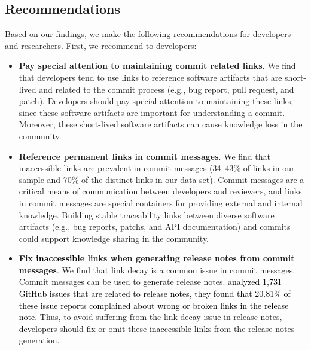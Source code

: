\documentclass[smallextended]{svjour3}       %
\newcommand{\fix}[1]{\textcolor{black}{#1}}
\newcommand{\minor}[1]{\textcolor{black}{#1}}
\begin{document}
\subsection{Recommendations}
Based on our findings, we make the following recommendations for developers and researchers. First,
we recommend to developers:
\begin{itemize}
\item \textbf{\textsf{Pay special attention to maintaining commit related links}}. We find that developers tend to use links to reference software artifacts that are short-lived and related to the commit process (e.g., bug report, pull request, and patch). Developers should pay special attention to maintaining these links, since these software artifacts are important for understanding a commit. Moreover, these short-lived software artifacts can cause knowledge loss in the community.

\item \textbf{\textsf{Reference permanent links in commit messages}}. We find that \minor{inaccessible} links are prevalent in commit messages (34--43\% of links in our sample and 70\% of the distinct links in our data set). Commit messages are a critical means of communication between developers and reviewers, and links in commit messages are special containers for providing external and internal knowledge. Building stable traceability links between diverse software artifacts (e.g., bug \fix{reports}, \fix{patchs}, and API documentation) and commits could support knowledge sharing in the community.

\item \textbf{\textsf{Fix \minor{inaccessible} links when generating release notes from commit messages}}. We find that link decay is a common issue in commit messages. Commit messages can be used to generate release notes. \fix{\cite{9796331} analyzed 1,731 GitHub issues that are related to release notes, they found that 20.81\% of these issue reports complained about wrong or broken links in the release note.} Thus, to avoid suffering from the link decay issue in release notes, \fix{developers} should fix or omit these \minor{inaccessible} links from the release notes generation.

\end{itemize}

\end{document}
